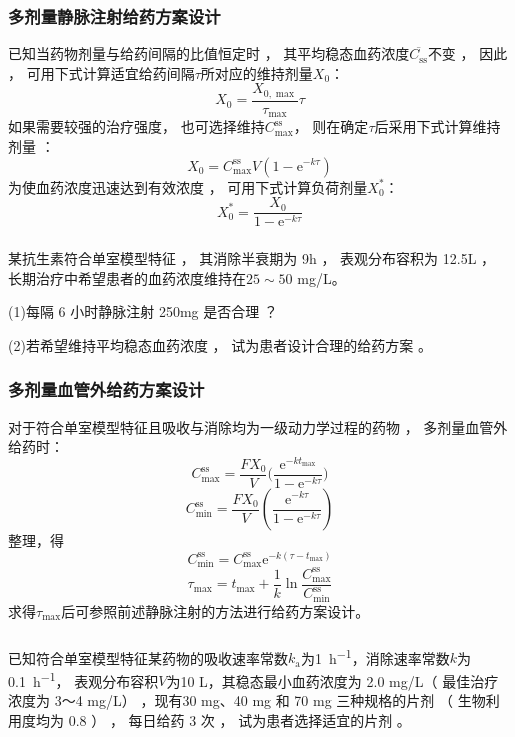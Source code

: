 \documentclass[dvipsnames, svgnames, x11names]{beamer}
\begin{document}
\begin{frame}
    \frametitle{多剂量静脉注射给药方案设计}
    已知当药物剂量与给药间隔的比值恒定时 ， 其平均稳态血药浓度$\overline{C_\mathrm{ss}}$不变 ， 因此 ， 可用下式计算适宜给药间隔$\tau$所对应的维持剂量$X_0$：
    \[
        X_0 = \frac{X_{0,\max}}{\tau_{\max}}\tau
    \]
    如果需要较强的治疗强度， 也可选择维持$C_{\max}^\mathrm{ss}$， 则在确定$\tau$后采用下式计算维持剂量 ：
    \[
        X_0 = C_{\max}^\mathrm{ss}V(1-\mathrm{e}^{-k\tau})
    \]
    为使血药浓度迅速达到有效浓度 ， 可用下式计算负荷剂量$X_0^*$：
    \[
        X_0^* = \frac{X_0}{1-\mathrm{e}^{-k\tau}}
    \]
\end{frame}


\begin{frame}[t]
    \frametitle{}
    \begin{example}
        某抗生素符合单室模型特征 ， 其消除半衰期为 9h ， 表观分布容积为 12.5L ， 长期治疗中希望患者的血药浓度维持在$25\sim 50$ mg/L。
        
        (1)每隔 6 小时静脉注射 250mg 是否合理 ？

        (2)若希望维持平均稳态血药浓度 ， 试为患者设计合理的给药方案 。
    \end{example}
\end{frame}


\begin{frame}
    \frametitle{多剂量血管外给药方案设计}
    对于符合单室模型特征且吸收与消除均为一级动力学过程的药物 ， 多剂量血管外给药时：
    \[
        C_{\max}^{\mathrm{ss}}=\frac{FX_{0}}{V}\Big(\frac{\mathrm{e}^{-kt_{\max}}}{1-\mathrm{e}^{-k\tau}}\Big)
    \]
    \[
        C_{\min}^{\mathrm{ss}} =\frac{FX_0}{V}\left(\frac{\mathrm{e}^{-k\tau}}{1-\mathrm{e}^{-k\tau}}\right)
    \]
    整理，得
    \[
        C_{\min}^{\mathrm{ss}} = C_{\max}^{\mathrm{ss}}\mathrm{e}^{-k(\tau - t_{\max})}
    \]
    \[
        \tau_{\max} = t_{\max} + \frac{1}{k}\ln \frac{C_{\max}^{\mathrm{ss}}}{C_{\min}^{\mathrm{ss}}}
    \]
    求得$\tau_{\max}$后可参照前述静脉注射的方法进行给药方案设计。
\end{frame}


\begin{frame}[t]
    \frametitle{}
    \begin{example}
        已知符合单室模型特征某药物的吸收速率常数$k_\mathrm{a}$为\SI{1}{h^{-1}}，消除速率常数$k$为\SI{0.1}{h^{-1}}， 表观分布容积$V$为10 L，其稳态最小血药浓度为 2.0 mg/L（ 最佳治疗浓度为 3～4 mg/L） ，现有30 mg、40 mg 和 70 mg 三种规格的片剂 （ 生物利用度均为 0.8 ） ， 每日给药 3 次 ， 试为患者选择适宜的片剂 。
    \end{example}
\end{frame}
\end{document}
